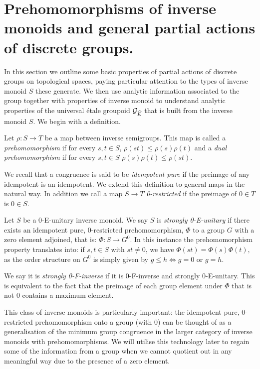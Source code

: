 \section{Prehomomorphisms of inverse monoids and general partial actions of discrete groups.}\label{Sect:S3} 
In this section we outline some basic properties of partial actions of discrete groups on topological spaces, paying particular attention to the types of inverse monoid $S$ these generate. We then use analytic information associated to the group together with properties of inverse monoid to understand analytic properties of the universal \'etale groupoid $\mathcal{G}_{\widehat{E}}$ that is built from the inverse monoid $S$. We begin with a definition.

\begin{definition}
Let $\rho: S \rightarrow T$ be a map between inverse semigroups. This map is called a \textit{prehomomorphism} if for every $s,t \in S$, $\rho(st) \leq \rho(s)\rho(t)$ and a \textit{dual prehomomorphism} if for every $s,t \in S$ $\rho(s)\rho(t) \leq \rho(st)$.
\end{definition}

We recall that a congruence is said to be \textit{idempotent pure} if the preimage of any idempotent is an idempotent. We extend this definition to general maps in the natural way. In addition we call a map $S \rightarrow T$ \textit{0-restricted} if the preimage of $0 \in T$ is $0 \in S$.

\begin{definition}
Let $S$ be a 0-E-unitary inverse monoid. We say $S$ is \textit{strongly 0-E-unitary} if there exists an idempotent pure, 0-restricted prehomomorphism, $\Phi$ to a group $G$ with a zero element adjoined, that is: $\Phi:S \rightarrow G^{0}$. In this instance the prehomomorphism property translates into: if $s,t \in S$ with $st \not = 0$, we have $\Phi(st)=\Phi(s)\Phi(t)$, as the order structure on $G^{0}$ is simply given by $g \leq h \Leftrightarrow g = 0$ or $g=h$.

We say it is \textit{strongly 0-F-inverse} if it is 0-F-inverse and strongly 0-E-unitary. This is equivalent to the fact that the preimage of each group element under $\Phi$ that is not $0$ contains a maximum element.
\end{definition}

This class of inverse monoids is particularly important: the idempotent pure, 0-restricted prehomomorphism onto a group (with 0) can be thought of as a generalisation of the minimum group congruence in the larger category of inverse monoids with prehomomorphisms. We will utilise this technology later to regain some of the information from a group when we cannot quotient out in any meaningful way due to the presence of a zero element.

